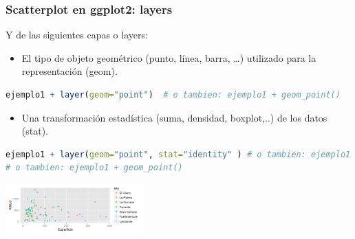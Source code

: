 \documentclass[8pt,ignorenonframetext,]{beamer}
\begin{document}
\begin{frame}[fragile]\frametitle{Scatterplot en ggplot2: layers}

Y de las siguientes capas o layers:

\begin{itemize}
\itemsep1pt\parskip0pt
\item
  El tipo de objeto geométrico (punto, línea, barra, \ldots{}) utilizado
  para la representación (geom).
\end{itemize}

\begin{lstlisting}[language=R]
  ejemplo1 + layer(geom="point")  # o tambien: ejemplo1 + geom_point() 
\end{lstlisting}

\begin{itemize}
\itemsep1pt\parskip0pt
\item
  Una transformación estadística (suma, densidad, boxplot,..) de los
  datos (stat).
\end{itemize}

\begin{lstlisting}[language=R]
  ejemplo1 + layer(geom="point", stat="identity" ) # o tambien: ejemplo1 + geom_point(stat="identity")  
# o tambien: ejemplo1 + geom_point()  
\end{lstlisting}

\begin{center}
\includegraphics[width=0.4\textwidth]{figure/unnamed-chunk-6.png}
\end{center}

\end{frame}
\end{document}

